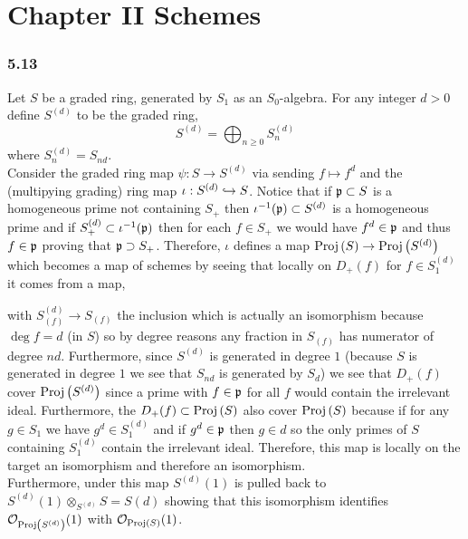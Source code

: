 \documentclass[12pt]{article}
\begin{document}
\tableofcontents

\newpage

\section{Chapter II Schemes}

\subsubsection{5.13}

Let $S$ be a graded ring, generated by $S_1$ as an $S_0$-algebra. For any integer $d > 0$ define $S^{(d)}$ to be the graded ring,
\[ S^{(d)} = \bigoplus_{n \ge 0} S^{(d)}_{n} \]
where $S^{(d)}_n = S_{nd}$. 
\bigskip\\
Consider the graded ring map $\psi : S \to S^{(d)}$ via sending $f \mapsto f^d$ and the (multipying grading) ring map $\iota : S^{(d)} \hookrightarrow S$. Notice that if $\mathfrak{p} \subset S$ is a homogeneous prime not containing $S_+$ then $\iota^{-1}(\mathfrak{p}) \subset S^{(d)}$ is a homogeneous prime and if $S^{(d)}_+ \subset \iota^{-1}(\mathfrak{p})$ then for each $f \in S_+$ we would have $f^d \in \mathfrak{p}$ and thus $f \in \mathfrak{p}$ proving that $\mathfrak{p} \supset S_+$. Therefore, $\iota$ defines a map $\mathrm{Proj}\left( S \right) \to \mathrm{Proj}\left( S^{(d)} \right)$ which becomes a map of schemes by seeing that locally on $D_+(f)$ for $f \in S^{(d)}_1$ it comes from a map,
\begin{center}
\end{center}
with $S^{(d)}_{(f)} \to S_{(f)}$ the inclusion which is actually an isomorphism because $\deg{f} = d$ (in $S$) so by degree reasons any fraction in $S_{(f)}$ has numerator of degree $n d$. Furthermore, since $S^{(d)}$ is generated in degree $1$ (because $S$ is generated in degree $1$ we see that $S_{nd}$ is generated by $S_d$) we see that $D_+(f)$ cover $\mathrm{Proj}\left( S^{(d)} \right)$ since a prime with $f \in \mathfrak{p}$ for all $f$ would contain the irrelevant ideal. Furthermore, the $D_+(f) \subset \mathrm{Proj}\left( S \right)$ also cover $\mathrm{Proj}\left( S \right)$ because if for any $g \in S_1$ we have $g^d \in S^{(d)}_1$ and if $g^d \in \mathfrak{p}$ then $g \in d$ so the only primes of $S$ containing $S^{(d)}_1$ contain the irrelevant ideal. Therefore, this map is locally on the target an isomorphism and therefore an isomorphism. 
\bigskip\\
Furthermore, under this map $S^{(d)}(1)$ is pulled back to $S^{(d)}(1) \otimes_{S^{(d)}} S = S(d)$ showing that this isomorphism identifies $\mathcal{O}_{\mathrm{Proj}\left( S^{(d)} \right)}(1)$ with $\mathcal{O}_{\mathrm{Proj}\left( S \right)}(1)$. 
\end{document}
